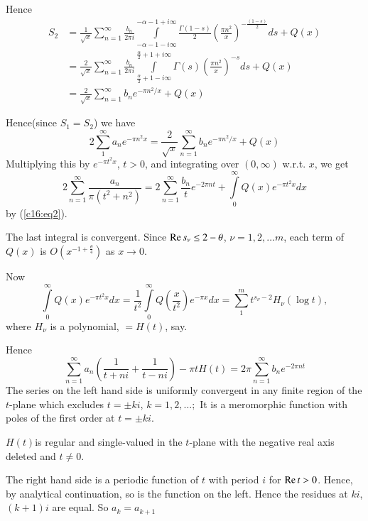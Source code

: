 Hence
\begin{align*}
S_2 & = \frac{1}{\surd x} \sum\limits^\infty_{n=1} \frac{b_n}{2\pi i}
\int\limits^{-\alpha - 1 + i \infty}_{-\alpha - 1 - i \infty} \frac{\Gamma(1-s)}{2} \left(\frac{\pi n^2}{x} \right)^{-\frac{(1-s)}{2}} ds
+ Q (x)\\
& = \frac{2}{\surd x} \sum\limits^\infty_{n=1} \frac{b_n}{2\pi i}
\int\limits^{\frac{\alpha}{2} + 1 + i \infty}_{\frac{\alpha}{2} + 1 -
  i \infty}  \Gamma(s) \left(\frac{\pi n^2}{x} \right)^{-s} ds +
Q(x)\\
& = \frac{2}{\surd x} \sum\limits^{\infty}_{n=1} b_n e^{-\pi n^2/x} +
Q(x) 
\end{align*}

Hence\pageoriginale (since $S_1 = S_2$) we have 
$$
2 \sum\limits^\infty_1 a_n e^{-\pi n^2 x} = \frac{2}{\surd x}
\sum\limits^\infty_{n=1} b_n e^{-\pi n^2/x} + Q(x)
$$
Multiplying this by $e^{-\pi t^2 x}$, $t>0$, and integrating over
$(0,\infty)$ w.r.t. $x$, we get
$$
2 \sum\limits^\infty_{n=1} \frac{a_n}{\pi(t^2+n^2)} = 2 
\sum\limits^\infty_{n=1} \frac{b_n}{t} e^{-2\pi nt} +
\int\limits^\infty_0 Q (x) e^{-\pi t^2 x }dx
$$
by (\ref{c16:eq2}).

The last integral is convergent. Since $\operatorname{Re} s_\nu \leq 2 - \theta$,
$\nu=1,2,\ldots m$, each term of $Q(x)$ is
$O(x^{-1+\frac{\theta}{4}})$ as $x\to 0$.

Now
$$
\int\limits^\infty_0 Q (x)e^{-\pi t^2x} dx = \frac{1}{t^2}
\int\limits^\infty_0 Q \left(\frac{x}{t^2} \right) e^{-\pi x} dx =
\sum\limits^m_1 t^{s_\nu -2}  H_\nu (\log t),
$$
where $H_\nu$ is a polynomial, $= H(t)$, say.
 
Hence
$$
\sum\limits^\infty_{n=1} a_n \left( \frac{1}{t+ni} +
\frac{1}{t-ni}\right) - \pi t H(t) = 2 \pi \sum\limits^\infty_{n=1}
b_n e^{-2\pi nt}
$$
The series on the left hand side is uniformly convergent in any finite
region of the $t$-plane which excludes $t=\pm ki$, $k=1,2,\ldots;$ It
is a meromorphic function with poles of the first order at $t=\pm ki$.

$H(t)$\pageoriginale is regular and single-valued in the $t$-plane
with the negative real axis deleted and $t \neq 0$.

The right hand side is a periodic function of $t$ with period $i$ for
$\operatorname{Re} t >0$. Hence, by analytical continuation, so is the function on
the left. Hence the residues at $ki$, $(k+1)i$ are equal. So $a_k =
a_{k+1}$


